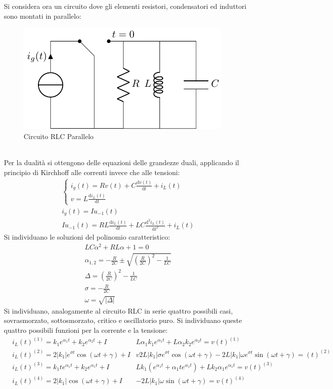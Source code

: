\documentclass{article}
\newcommand{\df}{\mathrm{d}}
\numberwithin{equation}{subsection}
\begin{document}
Si considera ora un circuito dove gli elementi resistori, condensatori ed induttori sono montati in parallelo: 
\begin{figure}[ht]%
    \centering
    \includegraphics{circuito-rlc-parallelo.pdf}
    \caption{Circuito RLC Parallelo}
    \label{fig:circuito-rlc-parallelo}
\end{figure}
\\
Per la dualità si ottengono delle equazioni delle grandezze duali, applicando il principio di Kirchhoff alle correnti invece che alle tensioni:
\begin{gather*}
    \begin{cases}
        i_g(t)=Rv(t)+C\displaystyle\frac{\df v(t)}{\df t}+i_L(t)\\
        v=\displaystyle L\frac{\df i_L(t)}{\df t}
    \end{cases}\\
    i_g(t)=Iu_{-1}(t)\\
    Iu_{-1}(t)=RL\displaystyle\frac{\df i_L(t)}{\df t}+LC\frac{\df^2i_L(t)}{\df t^2}+i_L(t)
\end{gather*}
Si individuano le soluzioni del polinomio caratteristico:
\begin{gather*}
    LC\alpha^2+RL\alpha+1=0\\
    \alpha_{1,2}=-\displaystyle\frac{R}{2C}\pm\sqrt{\left(\frac{R}{2C}\right)^2-\frac{1}{LC}}\\
    \Delta=\displaystyle\left(\frac{R}{2C}\right)^2-\frac{1}{LC}\\
    \sigma=\displaystyle-\frac{R}{2C}\\
    \omega=\sqrt{|\Delta|}
\end{gather*}
Si individuano, analogamente al circuito RLC in serie quattro possibili casi, sovrasmorzato, sottosmorzato, critico e oscillatorio puro. Si individuano queste quattro 
possibili funzioni per la corrente e la tensione: 
\begin{align*}
    &i_L(t)^{(1)}=k_1e^{\alpha_1t}+k_2e^{\alpha_2t}+I    &L\alpha_1k_1e^{\alpha_1t}+L\alpha_2k_2e^{\alpha_2t}=v(t)^{(1)}\\
    &i_L(t)^{(2)}=2|k_1|e^{\sigma t}\cos(\omega t+\gamma)+I    &v2L|k_1|\sigma e^{\sigma t}\cos(\omega t+\gamma)-2L|k_1|\omega e^{\sigma t}\sin(\omega t+\gamma)=(t)^{(2)}\\
    &i_L(t)^{(3)}=k_1te^{\alpha_1t}+k_2e^{\alpha_1t}+I    &Lk_1(e^{\alpha_1t}+\alpha_1te^{\alpha_1t})+Lk_2\alpha_1e^{\alpha_1t}=v(t)^{(3)}\\
    &i_L(t)^{(4)}=2|k_1|\cos(\omega t+\gamma)+I    &-2L|k_1|\omega\sin(\omega t+\gamma)=v(t)^{(4)}
\end{align*}
\end{document}
